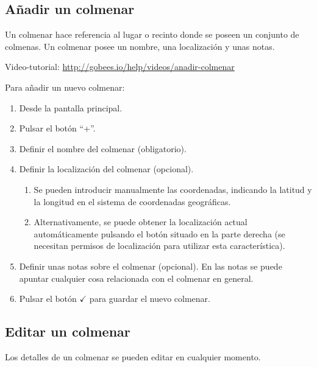 
\subsection{Añadir un colmenar}\label{auxf1adir-un-colmenar}

Un colmenar hace referencia al lugar o recinto donde se poseen un
conjunto de colmenas. Un colmenar posee un nombre, una localización y
unas notas.

Video-tutorial: \url{http://gobees.io/help/videos/anadir-colmenar}

Para añadir un nuevo colmenar:

\begin{enumerate}
\def\labelenumi{\arabic{enumi}.}
\tightlist
\item
  Desde la pantalla principal.
\item
  Pulsar el botón ``+''.
\item
  Definir el nombre del colmenar (obligatorio).
\item
  Definir la localización del colmenar (opcional).

  \begin{enumerate}
  \def\labelenumii{\alph{enumii}.}
  \tightlist
  \item
    Se pueden introducir manualmente las coordenadas, indicando la
    latitud y la longitud en el sistema de coordenadas geográficas.
  \item
    Alternativamente, se puede obtener la localización actual
    automáticamente pulsando el botón situado en la parte derecha (se
    necesitan permisos de localización para utilizar esta
    característica).
  \end{enumerate}
\item
  Definir unas notas sobre el colmenar (opcional). En las notas se puede
  apuntar cualquier cosa relacionada con el colmenar en general.
\item
  Pulsar el botón {$\checkmark$} para guardar el nuevo colmenar.
\end{enumerate}


\subsection{Editar un colmenar}\label{editar-un-colmenar}

Los detalles de un colmenar se pueden editar en cualquier momento.


